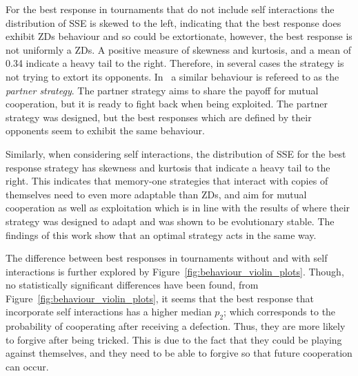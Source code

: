 For the best response in tournaments that do not include self interactions the
distribution of SSE is skewed to the left, indicating that the best response
does exhibit ZDs behaviour and so could be extortionate, however, the best
response is not uniformly a ZDs. A positive measure of skewness and kurtosis,
and a mean of 0.34 indicate a heavy tail to the right. Therefore, in several
cases the strategy is not trying to extort its opponents. In~\cite{Hilbe2018} a
similar behaviour is refereed to as the \textit{partner strategy}. The partner
strategy aims to share the payoff for mutual cooperation, but it is ready to
fight back when being exploited. The partner strategy was designed, but the best
responses which are defined by their opponents seem to exhibit the same
behaviour.

Similarly, when considering self interactions, the distribution of SSE for the
best response strategy has skewness and kurtosis that indicate a heavy tail to
the right. This indicates that memory-one strategies that interact with copies
of themselves need to even
more adaptable than ZDs, and aim for mutual cooperation as well as
exploitation which is in line with the results of \cite{Hilbe2018} where their
strategy was designed to adapt and was shown to be evolutionary stable. The
findings of this work show that an optimal strategy acts in the same way.

The difference between best responses in tournaments without and with self
interactions is further explored by Figure~\ref{fig:behaviour_violin_plots}.
Though, no statistically significant differences have been found, from
Figure~\ref{fig:behaviour_violin_plots}, it seems that the best response that
incorporate self interactions has a higher median $p_2$; which corresponds to
the probability of cooperating after receiving a defection. Thus, they are more
likely to forgive after being tricked. This is due to the fact that they could
be playing against themselves, and they need to be able to forgive so that
future cooperation can occur.

